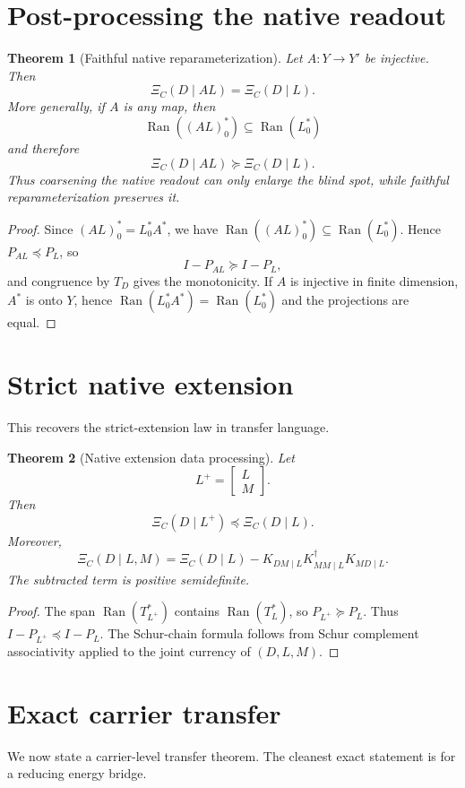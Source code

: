 \documentclass[11pt]{article}
\newtheorem{theorem}{Theorem}[section]
\DeclareMathOperator{\Ran}{Ran}
\newcommand{\pre}{\preceq}
\newcommand{\suc}{\succeq}
\begin{document}
\section{Post-processing the native readout}

\begin{theorem}[Faithful native reparameterization]
Let $A:Y\to Y'$ be injective.  Then
\[
  \Xi_C(D\mid AL)=\Xi_C(D\mid L).
\]
More generally, if $A$ is any map, then
\[
  \Ran((AL)_0^*)\subseteq \Ran(L_0^*)
\]
and therefore
\[
  \Xi_C(D\mid AL)\suc \Xi_C(D\mid L).
\]
Thus coarsening the native readout can only enlarge the blind spot, while faithful reparameterization preserves it.
\end{theorem}

\begin{proof}
Since $(AL)_0^*=L_0^*A^*$, we have $\Ran((AL)_0^*)\subseteq\Ran(L_0^*)$.  Hence $P_{AL}\pre P_L$, so
\[
  I-P_{AL}\suc I-P_L,
\]
and congruence by $T_D$ gives the monotonicity.  If $A$ is injective in finite dimension, $A^*$ is onto $Y$, hence $\Ran(L_0^*A^*)=\Ran(L_0^*)$ and the projections are equal.
\end{proof}

\section{Strict native extension}
This recovers the strict-extension law in transfer language.

\begin{theorem}[Native extension data processing]
Let
\[
  L^+=\begin{bmatrix}L\\M\end{bmatrix}.
\]
Then
\[
  \Xi_C(D\mid L^+)\pre\Xi_C(D\mid L).
\]
Moreover,
\[
  \Xi_C(D\mid L,M)
  =\Xi_C(D\mid L)-K_{DM\mid L}K_{MM\mid L}^{\dagger}K_{MD\mid L}.
\]
The subtracted term is positive semidefinite.
\end{theorem}

\begin{proof}
The span $\Ran(T_{L^+}^*)$ contains $\Ran(T_L^*)$, so $P_{L^+}\suc P_L$.  Thus $I-P_{L^+}\pre I-P_L$.  The Schur-chain formula follows from Schur complement associativity applied to the joint currency of $(D,L,M)$.
\end{proof}

\section{Exact carrier transfer}
We now state a carrier-level transfer theorem.  The cleanest exact statement is for a reducing energy bridge.
\end{document}
